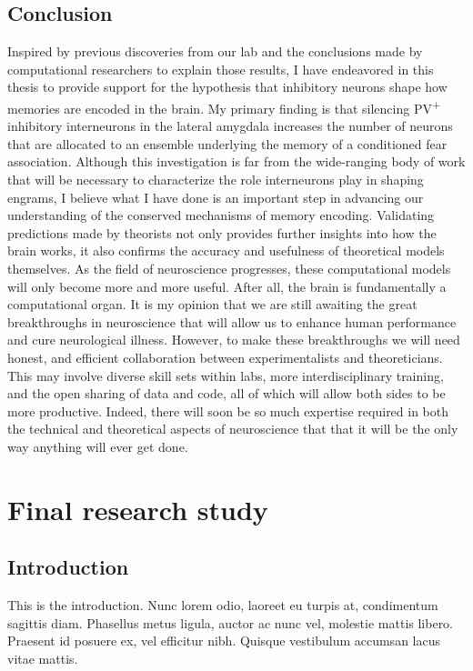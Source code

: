 \documentclass[12pt,a4paper,]{report}
\begin{document}
\section{Conclusion}\label{conclusion-5}

Inspired by previous discoveries from our lab and the conclusions made
by computational researchers to explain those results, I have endeavored
in this thesis to provide support for the hypothesis that inhibitory
neurons shape how memories are encoded in the brain. My primary finding
is that silencing PV\textsuperscript{+} inhibitory interneurons in the
lateral amygdala increases the number of neurons that are allocated to
an ensemble underlying the memory of a conditioned fear association.
Although this investigation is far from the wide-ranging body of work
that will be necessary to characterize the role interneurons play in
shaping engrams, I believe what I have done is an important step in
advancing our understanding of the conserved mechanisms of memory
encoding. Validating predictions made by theorists not only provides
further insights into how the brain works, it also confirms the accuracy
and usefulness of theoretical models themselves. As the field of
neuroscience progresses, these computational models will only become
more and more useful. After all, the brain is fundamentally a
computational organ. It is my opinion that we are still awaiting the
great breakthroughs in neuroscience that will allow us to enhance human
performance and cure neurological illness. However, to make these
breakthroughs we will need honest, and efficient collaboration between
experimentalists and theoreticians. This may involve diverse skill sets
within labs, more interdisciplinary training, and the open sharing of
data and code, all of which will allow both sides to be more productive.
Indeed, there will soon be so much expertise required in both the
technical and theoretical aspects of neuroscience that that it will be
the only way anything will ever get done.

\chapter{Final research study}\label{final-research-study}

\section{Introduction}\label{introduction-5}

This is the introduction. Nunc lorem odio, laoreet eu turpis at,
condimentum sagittis diam. Phasellus metus ligula, auctor ac nunc vel,
molestie mattis libero. Praesent id posuere ex, vel efficitur nibh.
Quisque vestibulum accumsan lacus vitae mattis.
\end{document}
